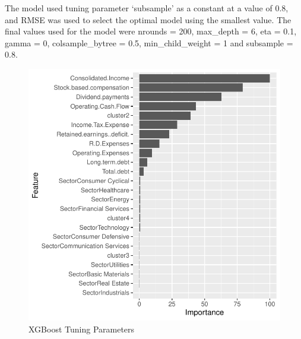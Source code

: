 \documentclass[11pt,]{article}
\begin{document}
The model used tuning parameter `subsample' as a constant at a value of
0.8, and RMSE was used to select the optimal model using the smallest
value. The final values used for the model were nrounds = 200,
max\_depth = 6, eta = 0.1, gamma = 0, colsample\_bytree = 0.5,
min\_child\_weight = 1 and subsample = 0.8.

\begin{figure}

{\centering \includegraphics{stock_analysis_files/figure-latex/XGBoost-1} 

}

\caption{XGBoost Tuning Parameters}\label{fig:XGBoost-1}
\end{figure}
\end{document}
